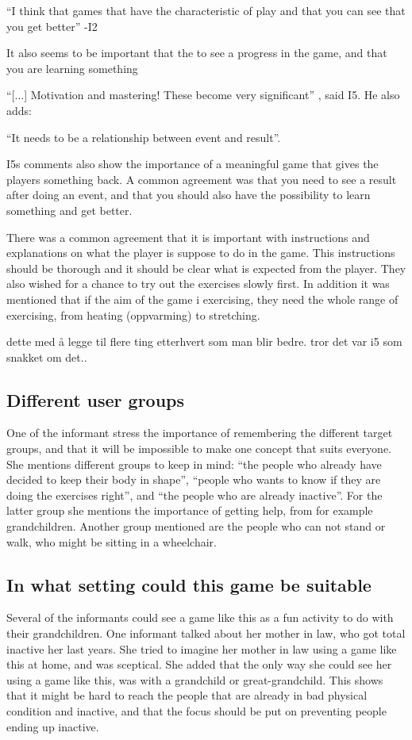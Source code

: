 “I think that games that have the characteristic of play and that you can see that you get better” -I2

It also seems to be important that the to see a progress in the game, and that you are learning something 

“[...] Motivation and mastering! These become very significant” , said I5. He also adds:

“It needs to be a relationship between event and result”.

I5s comments also show the importance of a meaningful game that gives the players something back. A common agreement was that you need to see a result after doing an event, and that you should also have the possibility to learn something and get better. 

There was a common agreement that it is important with instructions and explanations on what the player is suppose to do in the game. This instructions should be thorough and it should be clear what is expected from the player. They also wished for a chance to try out the exercises slowly first. In addition it was mentioned that if the aim of the game i exercising, they need the whole range of exercising, from heating (oppvarming) to stretching. 

dette med å legge til flere ting etterhvert som man blir bedre. tror det var i5 som snakket om det..

\subsection{Different user groups}
One of the informant stress the importance of remembering the different target groups, and that it will be impossible to make one concept that suits everyone. She mentions different groups to keep in mind: “the people who already have decided to keep their body in shape”, “people who wants to know if they are doing the exercises right”, and “the people who are already inactive”. For the latter group she mentions the importance of getting help, from for example grandchildren.  Another group mentioned are the people who can not stand or walk, who might be sitting in a wheelchair. 

\subsection{In what setting could this game be suitable}
Several of the informants could see a game like this as a fun activity to do with their grandchildren. One informant talked about her mother in law, who got total inactive her last years. She tried to imagine her mother in law using a game like this at home, and was sceptical. She added that the only way she could see her using a game like this, was with a grandchild or great-grandchild. This shows that it might be hard to reach the people that are already in bad physical condition and inactive, and that the focus should be put on preventing people ending up inactive. 

